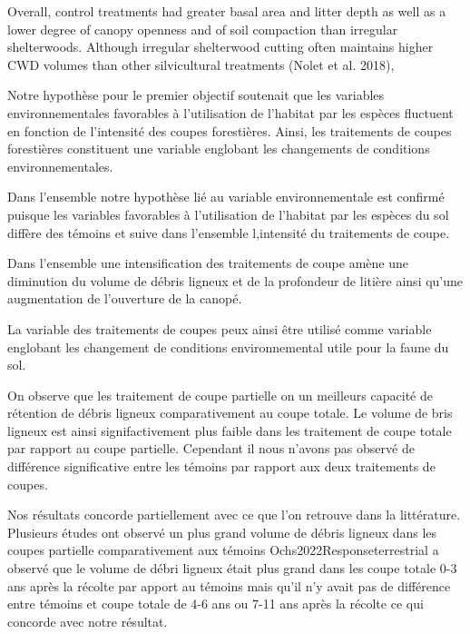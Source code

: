 Overall, control treatments had greater basal area and litter depth as well as a lower degree of canopy openness and of soil compaction than irregular shelterwoods. 
Although irregular shelterwood cutting often maintains higher CWD volumes than other silvicultural treatments (Nolet et al. 2018),


Notre hypothèse pour le premier objectif soutenait que les variables environnementales favorables à l'utilisation de l'habitat par les espèces fluctuent 
en fonction de l'intensité des coupes forestières. 
Ainsi, les traitements de coupes forestières constituent une variable englobant les changements de conditions environnementales.


Dans l'ensemble notre hypothèse lié au variable environnementale est confirmé puisque les variables favorables à l'utilisation de l'habitat par les espèces du sol 
diffère des témoins et suive dans l'ensemble l,intensité du traitements de coupe.

Dans l'ensemble une intensification des traitements de coupe amène une diminution du volume de débris ligneux et de la profondeur de litière ainsi qu'une augmentation de l'ouverture de la canopé.

La variable des traitements de coupes peux ainsi être utilisé comme variable englobant les changement de conditions environnemental utile pour la faune du sol. 



On observe que les traitement de coupe partielle on un meilleurs capacité de rétention de débris ligneux comparativement au coupe totale. 
Le volume de bris ligneux est ainsi signifactivement plus faible dans les traitement de coupe totale par rapport au coupe partielle. 
Cependant il nous n'avons pas observé de différence significative entre les témoins par rapport aux deux traitements de coupes. 

Nos résultats concorde partiellement avec ce que l'on retrouve dans la littérature. 
Plusieurs études ont observé un plus grand volume de débris ligneux dans les coupes partielle comparativement aux témoins
Ochs2022Responseterrestrial a observé que le volume de débri ligneux était plus grand dans les coupe totale 0-3 ans après la récolte par apport au témoins 
mais qu'il n'y avait pas de différence entre témoins et coupe totale de 4-6 ans  ou 7-11 ans après la récolte ce qui concorde avec notre résultat.

